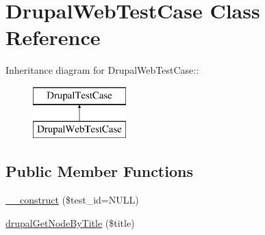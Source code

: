 \hypertarget{class_drupal_web_test_case}{
\section{DrupalWebTestCase Class Reference}
\label{class_drupal_web_test_case}
}
Inheritance diagram for DrupalWebTestCase::\begin{figure}[H]
\begin{center}
\leavevmode
\includegraphics[height=2cm]{class_drupal_web_test_case}
\end{center}
\end{figure}
\subsection*{Public Member Functions}
\begin{DoxyCompactItemize}
\item 
\hyperlink{class_drupal_web_test_case_a76d165c12dc6042bae017b5c521e6ffa}{\_\-\_\-construct} (\$test\_\-id=NULL)
\item 
\hyperlink{class_drupal_web_test_case_ae3312c84795861f1bb35c226ef700903}{drupalGetNodeByTitle} (\$title)
\end{DoxyCompactItemize}
